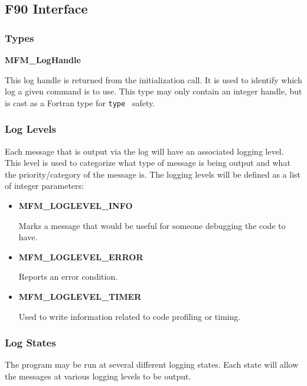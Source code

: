\subsection{F90 Interface}
\subsubsection{Types}

{\bf MFM\_LogHandle}

This log handle is returned from the initialization call.  It is used to
identify which log a given command is to use.  This type may only contain an
integer handle, but is cast as a Fortran type for {\tt type } safety.

\subsubsection{Log Levels}

Each message that is output via the log will have an associated logging
level.  This level is used to categorize what type of message is being output
and what the priority/category of the message is.
The logging levels will be defined as a list of integer parameters:

\begin{itemize}
\item{\bf MFM\_LOGLEVEL\_INFO}

Marks a message that would be useful for someone debugging the code to have.

\item{\bf MFM\_LOGLEVEL\_ERROR}

Reports an error condition.

\item{\bf MFM\_LOGLEVEL\_TIMER}

Used to write information related to code profiling or timing.

\end{itemize}

\subsubsection{Log States}

The program may be run at several different logging states.  Each state will
allow the messages at various logging levels to be output. 

